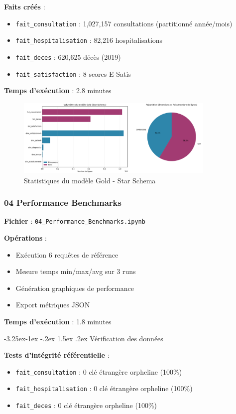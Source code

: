 \documentclass[12pt,a4paper]{article}
\makeatletter
\renewcommand\subsection{\@startsection{subsection}{2}{\z@}%
    {-3.25ex\@plus -1ex \@minus -.2ex}%
    {1.5ex \@plus .2ex}%
    {\normalfont\large\bfseries\color{blue!50!black}}}
\makeatother
\begin{document}
\textbf{Faits créés} :
\begin{itemize}
\item \texttt{fait\_consultation} : 1,027,157 consultations (partitionné année/mois)
\item \texttt{fait\_hospitalisation} : 82,216 hospitalisations
\item \texttt{fait\_deces} : 620,625 décès (2019)
\item \texttt{fait\_satisfaction} : 8 scores E-Satis
\end{itemize}

\textbf{Temps d'exécution} : 2.8 minutes

\begin{figure}[H]
\centering
\includegraphics[width=0.85\textwidth]{gold_star_schema_stats.png}
\caption{Statistiques du modèle Gold - Star Schema}
\label{fig:gold_stats}
\end{figure}

\subsubsection{04 Performance Benchmarks}

\textbf{Fichier} : \texttt{04\_Performance\_Benchmarks.ipynb}

\textbf{Opérations} :
\begin{itemize}
\item Exécution 6 requêtes de référence
\item Mesure temps min/max/avg sur 3 runs
\item Génération graphiques de performance
\item Export métriques JSON
\end{itemize}

\textbf{Temps d'exécution} : 1.8 minutes

\subsection{Vérification des données}

\textbf{Tests d'intégrité référentielle} :
\begin{itemize}
\item \texttt{fait\_consultation} : 0 clé étrangère orpheline (100\%)
\item \texttt{fait\_hospitalisation} : 0 clé étrangère orpheline (100\%)
\item \texttt{fait\_deces} : 0 clé étrangère orpheline (100\%)
\end{itemize}
\end{document}
